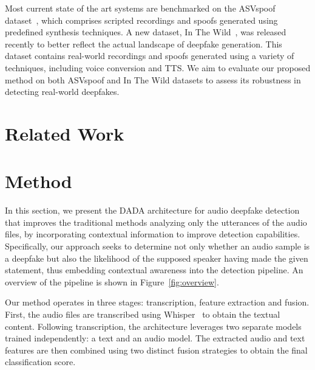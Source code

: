 \documentclass{Interspeech}
\begin{document}
Most current state of the art systems are benchmarked on the ASVspoof
dataset~\cite{ASVspoof_21}, which comprises scripted recordings and spoofs
generated using predefined synthesis techniques. A new dataset, In The
Wild~\cite{in_the_wild}, was released recently to better reflect the actual
landscape of deepfake generation. This dataset contains real-world recordings
and spoofs generated using a variety of techniques, including voice conversion
and TTS. We aim to evaluate our proposed method on both ASVspoof and In The
Wild datasets to assess its robustness in detecting real-world deepfakes.


\section{Related Work}\label{sec:related_work}

\section{Method}\label{sec:method}

In this section, we present the DADA architecture for audio deepfake detection
that improves the traditional methods analyzing only the utterances of the
audio files, by incorporating contextual information to improve detection
capabilities. Specifically, our approach seeks to determine not only whether an
audio sample is a deepfake but also the likelihood of the supposed speaker
having made the given statement, thus embedding contextual awareness into the
detection pipeline. An overview of the pipeline is shown in
Figure~\ref{fig:overview}.

Our method operates in three stages: transcription, feature extraction and
fusion. First, the audio files are transcribed using
Whisper~\cite{radford2023robust} to obtain the textual content. Following
transcription, the architecture leverages two separate models trained
independently: a text and an audio model. The extracted audio and text features
are then combined using two distinct fusion strategies to obtain the final
classification score.
\end{document}
